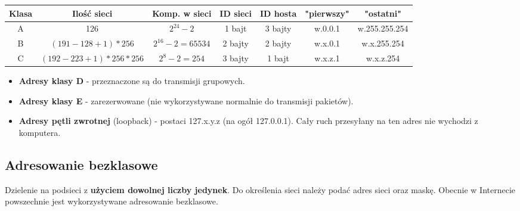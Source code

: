 \documentclass[../main.tex]{subfiles}
\begin{document}
    \begin{tabular}{|c|c|c|c|c|c|c|}
        \hline
        Klasa & Ilość sieci & Komp. w sieci & ID sieci & ID hosta & "pierwszy" & "ostatni"\\
        \hline
        A & 126 & $2^{24}-2$ & 1 bajt & 3 bajty & w.0.0.1 & w.255.255.254\\
        \hline
        B & $(191-128+1)*256$ & $2^{16}-2 = 65 534$ & 2 bajty & 2 bajty & w.x.0.1 & w.x.255.254\\
        \hline
        C & $(192-223+1)*256*256$ & $2^8 -2 = 254$ & 3 bajty & 1 bajt & w.x.z.1 & w.x.z.254\\
        \hline
    \end{tabular}

    \begin{itemize}
        \item \textbf{Adresy klasy D} - przeznaczone są do transmisji grupowych.
        \item \textbf{Adresy klasy E} - zarezerwowane (nie wykorzystywane normalnie do transmisji pakietów).
        \item \textbf{Adresy pętli zwrotnej} (loopback) - postaci 127.x.y.z (na ogół 127.0.0.1). Cały ruch przesyłany na ten adres nie wychodzi z komputera.
    \end{itemize}


    \subsection{Adresowanie bezklasowe}
    Dzielenie na podsieci z \textbf{użyciem dowolnej liczby jedynek}. Do określenia sieci należy podać adres
    sieci oraz maskę. Obecnie w Internecie powszechnie jest wykorzystywane adresowanie
    bezklasowe.
\end{document}
